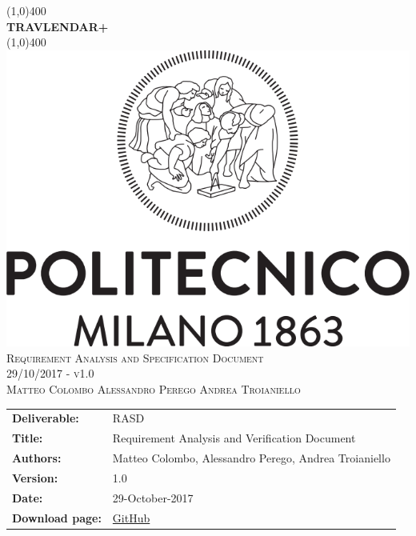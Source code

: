 



\begin{titlepage}
	\begin{center}
		\line(1,0){400}\\	[0.6cm]
		\Huge{\bfseries{TRAVLENDAR+}}\\
		\line(1,0){400}\\
		[3cm]
		\includegraphics[scale=0.3]{Images/polimi}\\
		[3cm]
		\textsc{\Huge Requirement Analysis and Specification Document}\\[1cm]
		\textsc{\huge 29/10/2017 - v1.0}\\
		[4cm]
		\textsc{\normalsize Matteo Colombo \hspace{0.4cm} Alessandro Perego \hspace{0.4cm} Andrea Troianiello }
	\end{center}
\end{titlepage}
	
\begin{table}[h!]
\begin{tabu} to \textwidth { X[0.3,r,p] X[0.7,l,p] }
\hline

\textbf{Deliverable:} & RASD\\
\textbf{Title:} & Requirement Analysis and Verification Document \\
\textbf{Authors:} & Matteo Colombo, Alessandro Perego, Andrea Troianiello \\
\textbf{Version:} & 1.0 \\ 
\textbf{Date:} & 29-October-2017 \\
\textbf{Download page:} & \href{https://github.com/MatteoColombo/ColomboPeregoTroianiello}{GitHub} \\
\hline
\end{tabu}
\end{table}

